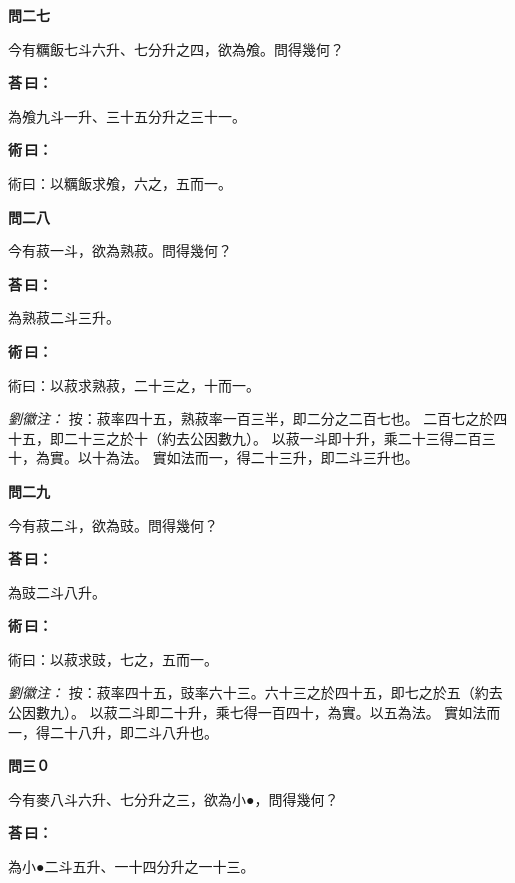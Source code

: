 \documentclass[11pt,a4paper]{article}
\newenvironment{problem}[1][]{%
  \par\vspace{0.6em}\noindent\textcolor{problemcolor}{\textbf{問\ignorespaces#1\unskip}\hspace{0.5em}}%
  \ignorespaces
}{\par\vspace{0.4em}}
\newenvironment{answer}{%
  \par\noindent\textcolor{answercolor}{\textbf{荅\,曰：}}%
  \ignorespaces
}{\par\vspace{0.3em}}
\newenvironment{method}{%
  \par\noindent\textcolor{methodcolor}{\textbf{術\,曰：}}%
  \ignorespaces
}{\par\vspace{0.4em}}
\newenvironment{liuhuicomm}{%
  \par\vspace{0.3em}\noindent\textcolor{commentarycolor}{\small\textit{劉徽注：}}}%
  {\par\vspace{0.5em}}
\begin{document}
\begin{problem}[二七]
今有糲飯七斗六升、七分升之四，欲為飧。問得幾何？
\end{problem}

\begin{answer}
為飧九斗一升、三十五分升之三十一。
\end{answer}

\begin{method}
術曰：以糲飯求飧，六之，五而一。
\end{method}

\begin{problem}[二八]
今有菽一斗，欲為熟菽。問得幾何？
\end{problem}

\begin{answer}
為熟菽二斗三升。
\end{answer}

\begin{method}
術曰：以菽求熟菽，二十三之，十而一。
\end{method}

\begin{liuhuicomm}
按：菽率四十五，熟菽率一百三半，即二分之二百七也。
二百七之於四十五，即二十三之於十（約去公因數九）。
以菽一斗即十升，乘二十三得二百三十，為實。以十為法。
實如法而一，得二十三升，即二斗三升也。
\end{liuhuicomm}

\begin{problem}[二九]
今有菽二斗，欲為豉。問得幾何？
\end{problem}

\begin{answer}
為豉二斗八升。
\end{answer}

\begin{method}
術曰：以菽求豉，七之，五而一。
\end{method}

\begin{liuhuicomm}
按：菽率四十五，豉率六十三。六十三之於四十五，即七之於五（約去公因數九）。
以菽二斗即二十升，乘七得一百四十，為實。以五為法。
實如法而一，得二十八升，即二斗八升也。
\end{liuhuicomm}

\begin{problem}[三０]
今有麥八斗六升、七分升之三，欲為小●，問得幾何？
\end{problem}

\begin{answer}
為小●二斗五升、一十四分升之一十三。
\end{answer}
\end{document}
